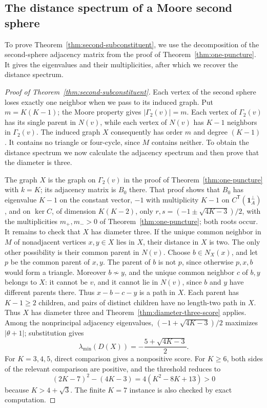 \documentclass[a4paper,10pt,reqno]{amsart}
\theoremstyle{plain}
\theoremstyle{definition}
\theoremstyle{remark}
\newcommand{\one}{\mathbf 1}
\begin{document}
\subsection{The distance spectrum of a Moore second sphere}
\label{app:second-sphere-proof}

To prove Theorem~\ref{thm:second-subconstituent}, we use the decomposition
of the second-sphere adjacency matrix from the proof of
Theorem~\ref{thm:one-puncture}. It gives the eigenvalues and their
multiplicities, after which we recover the distance spectrum.

\begin{proof}[Proof of Theorem~\ref{thm:second-subconstituent}]
Each vertex of the second sphere loses exactly one neighbor when we
pass to its induced graph.  Put \(m=K(K-1)\); the Moore property gives
\(\lvert\Gamma_2(v)\rvert=m\).  Each vertex of \(\Gamma_2(v)\) has its
single parent in \(N(v)\), while each vertex of \(N(v)\) has \(K-1\)
neighbors in \(\Gamma_2(v)\).  The induced graph \(X\) consequently has
order \(m\) and degree \((K-1)\).  It contains no triangle or four-cycle,
since \(M\) contains neither.  To obtain the distance spectrum we now
calculate the adjacency spectrum and then prove that the diameter is three.

The graph \(X\) is the graph on \(\Gamma_2(v)\) in the proof of
Theorem~\ref{thm:one-puncture} with \(k=K\); its adjacency matrix is \(B_0\)
there. That proof shows that \(B_0\) has eigenvalue \(K-1\) on the constant
vector, \(-1\) with multiplicity \(K-1\) on
\(C^{\mathsf T}(\one_A^\perp)\), and on \(\ker C\), of dimension
\(K(K-2)\), only \(r,s=(-1\pm\sqrt{4K-3})/2\), with the multiplicities
\(m_+,m_->0\) of Theorem~\ref{thm:one-puncture}; both roots occur.
It remains to check that \(X\) has diameter three.
If the unique common neighbor in \(M\) of nonadjacent vertices \(x,y\in X\)
lies in \(X\), their distance in \(X\) is two.  The only other
possibility is their common parent in \(N(v)\).  Choose
\(b\in N_X(x)\), and let \(p\) be the common parent of \(x,y\).
The parent of \(b\) is not \(p\), since otherwise \(p,x,b\) would form
a triangle.
Moreover \(b\not\sim y\), and the unique common neighbor
\(c\) of \(b,y\) belongs to \(X\): it cannot be \(v\), and it cannot
lie in \(N(v)\), since \(b\) and \(y\) have different parents there.
Thus \(x-b-c-y\) is a path in \(X\).  Each parent has \(K-1\ge2\)
children, and pairs of distinct children have no length-two path in \(X\).
Thus \(X\) has diameter three and
Theorem~\ref{thm:diameter-three-score} applies.  Among the nonprincipal
adjacency eigenvalues, \((-1+\sqrt{4K-3})/2\) maximizes
\(|\theta+1|\); substitution gives
\[
 \lambda_{\min}(D(X))=-\frac{5+\sqrt{4K-3}}2.
\]
For \(K=3,4,5\), direct comparison gives a nonpositive score.  For
\(K\ge6\), both sides of the relevant comparison are positive, and the
threshold reduces to
\[
 (2K-7)^2-(4K-3)=4(K^2-8K+13)>0
\]
because \(K>4+\sqrt3\).  The finite \(K=7\) instance is also checked by exact computation.
\end{proof}
\end{document}
